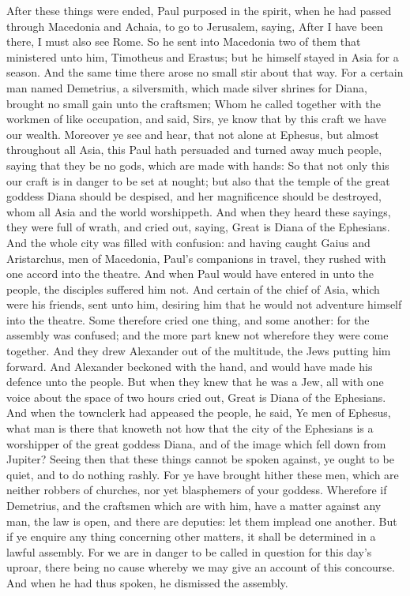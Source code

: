  After these things were ended, Paul purposed in the
spirit, when he had passed through Macedonia and Achaia, to go to
Jerusalem, saying, After I have been there, I must also see Rome.
 So he sent into Macedonia two of them that ministered unto
him, Timotheus and Erastus; but he himself stayed in Asia for a season.
 And the same time there arose no small stir about that
way.  For a certain man named Demetrius, a silversmith,
which made silver shrines for Diana, brought no small gain unto the
craftsmen;  Whom he called together with the workmen of
like occupation, and said, Sirs, ye know that by this craft we have our
wealth.  Moreover ye see and hear, that not alone at
Ephesus, but almost throughout all Asia, this Paul hath persuaded and
turned away much people, saying that they be no gods, which are made
with hands:  So that not only this our craft is in danger
to be set at nought; but also that the temple of the great goddess Diana
should be despised, and her magnificence should be destroyed, whom all
Asia and the world worshippeth.  And when they heard these
sayings, they were full of wrath, and cried out, saying, Great is Diana
of the Ephesians.  And the whole city was filled with
confusion: and having caught Gaius and Aristarchus, men of Macedonia,
Paul's companions in travel, they rushed with one accord into the
theatre.  And when Paul would have entered in unto the
people, the disciples suffered him not.  And certain of the
chief of Asia, which were his friends, sent unto him, desiring him that
he would not adventure himself into the theatre.  Some
therefore cried one thing, and some another: for the assembly was
confused; and the more part knew not wherefore they were come together.
 And they drew Alexander out of the multitude, the Jews
putting him forward. And Alexander beckoned with the hand, and would
have made his defence unto the people.  But when they knew
that he was a Jew, all with one voice about the space of two hours cried
out, Great is Diana of the Ephesians.  And when the
townclerk had appeased the people, he said, Ye men of Ephesus, what man
is there that knoweth not how that the city of the Ephesians is a
worshipper of the great goddess Diana, and of the image which fell down
from Jupiter?  Seeing then that these things cannot be
spoken against, ye ought to be quiet, and to do nothing rashly.
 For ye have brought hither these men, which are neither
robbers of churches, nor yet blasphemers of your goddess. 
Wherefore if Demetrius, and the craftsmen which are with him, have a
matter against any man, the law is open, and there are deputies: let
them implead one another.  But if ye enquire any thing
concerning other matters, it shall be determined in a lawful assembly.
 For we are in danger to be called in question for this
day's uproar, there being no cause whereby we may give an account of
this concourse.  And when he had thus spoken, he dismissed
the assembly.

